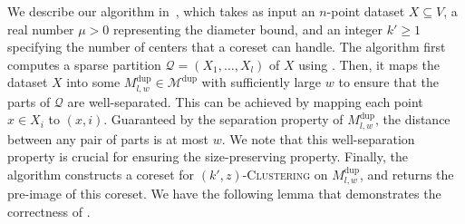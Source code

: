 \documentclass[letterpaper,11pt]{article}
\theoremstyle{plain}
\theoremstyle{definition}
\theoremstyle{remark}
\newcommand{\dup}{\mathrm{dup}}
\newcommand{\calM}{\mathcal{M}}
\newcommand{\calQ}{\mathcal{Q}}
\newcommand{\ProblemName}[1]{\textsc{#1}}
\newcommand{\tzC}[1]{\ProblemName{$(#1,z)$-Clustering}\xspace}
\begin{document}
We describe our algorithm in~, which takes as input an $n$-point dataset $X\subseteq V$, a real number $\mu>0$ representing the diameter bound, and an integer $k'\geq 1$ specifying the number of centers that a coreset can handle.
The algorithm first computes a sparse partition $\calQ=(X_1,\dots,X_l)$ of $X$ using . Then, it maps the dataset $X$ into some $M^\dup_{l,w}\in \calM^{\dup}$ with sufficiently large $w$ to ensure that the parts of $\calQ$ are well-separated. 
This can be achieved by mapping each point $x\in X_i$ to $(x,i)$. Guaranteed by the separation property of $M^\dup_{l,w}$, the distance between any pair of parts is at most $w$. We note that this well-separation property is crucial for ensuring the size-preserving property.
Finally, the algorithm constructs a coreset for \tzC{k'} on $M^\dup_{l,w}$, and returns the pre-image of this coreset.
We have the following lemma that demonstrates the correctness of . 
\end{document}
